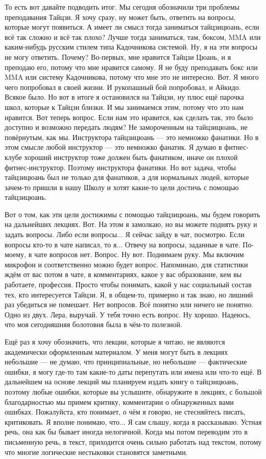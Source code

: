 То есть вот 
давайте подводить итог.  Мы сегодня обозначили три 
проблемы преподавания Тайцзи. Я хочу сразу, ну может 
быть, ответить на вопросы, которые могут появиться.  А 
имеет ли смысл тогда заниматься тайцзицюань, если всё
так сложно и всё так плохо? Лучше тогда заниматься, там, 
боксом, MMA или каким-нибудь русским стилем 
типа Кадочникова системой.  Ну, я на эти вопросы не 
могу ответить. Почему? Во-первых, мне нравится Тайцзи 
Цюань, и я преподаю его, потому что мне нравится 
самому. Я не буду преподавать бокс или MMA или систему 
Кадочникова, потому что мне это не интересно. Вот. Я 
много чего попробовал в своей жизни. И рукопашный бой 
попробовал,  и Айкидо. Всякое было. Но вот в итоге я 
остановился на Тайцзи, ну плюс ещё парочка школ, 
которые к Тайцзи близки.  И мы занимаемся этим, потому 
что это нам нравится. Вот теперь вопрос. Если нам это 
нравится, как сделать так, это было доступно и 
возможно  передать людям? Не замороченным на тайцзицюань,
не повёрнутым, как мы.  Инструктора тайцзицюань
--- это немножко фанатики. Но в этом смысле любой 
инструктор --- это немножко фанатик. Я думаю в 
фитнес-клубе хороший инструктор тоже должен быть 
фанатиком, иначе он плохой фитнес-инструктор.  Поэтому 
инструктора фанатики. Но вот задача, чтобы тайцзицюань
был не только для фанатиков, а для нормальных 
людей, которые зачем-то пришли в нашу Школу и хотят 
какие-то цели достичь с помощью тайцзицюань.

Вот о том, 
как эти цели достижимы с помощью тайцзицюань, мы будем 
говорить на дальнейших лекциях.  Вот. На этом я 
замолкаю, но вы можете поднять руку и задать вопросы.  
Либо если вопросы... Я сейчас зайду в чат, посмотрю. 
Если вопросы кто-то в чате написал, то я... Отвечу на 
вопросы, заданные в чате. По-моему, в чате вопросов нет. 
Вопрос. Ну вот.  Поднимаем руку.  Мы включим микрофон и 
соответственно можно будет вопрос.  Напоминаю, для 
статистики ждём от вас потом в чате, в комментариях,  
какое у вас образование, кем вы работаете, профессия. 
Просто чтобы понимать,  какой у нас социальный состав 
тех, кто интересуется Тайцзи. Я, в общем-то, примерно и 
так знаю,  но лишний раз убедиться не помешает. Нет 
вопросов. Всё понятно или ничего не понятно.  Одно из 
двух.  Лера, выручай. У тебя точно есть вопрос. Ну 
хорошо. Надеюсь,  что моя сегодняшняя болотовня была в 
чём-то полезной.

Ещё раз я хочу обозначить,  что 
лекции, которые я читаю, не являются академически 
оформленным материалом. У меня могут быть в лекциях 
небольшие ---  не думаю, что принципиальные, но небольшие --- 
фактические ошибки, я могу где-то там какие-то даты 
перепутать или имена или что-то ещё.  В дальнейшем на 
основе лекций мы планируем издать книгу о 
тайцзицюань, поэтому любые ошибки, которые вы 
услышите, обнаружите в лекциях, с большой 
благодарностью мы примем критику,  комментарии о 
обнаруженных вами ошибках. Пожалуйста, кто понимает, о 
чём я говорю, не стесняйтесь писать,  критиковать.  Я 
вполне понимаю, что... Я сам слышу, когда я рассказываю.
Устная речь, она как бы бывает иногда нелогичной.  
Когда мы потом переводим это в письменную речь, в 
текст, приходится очень сильно работать над текстом, 
потому что многие логические нестыковки становятся 
заметными.

\bye

